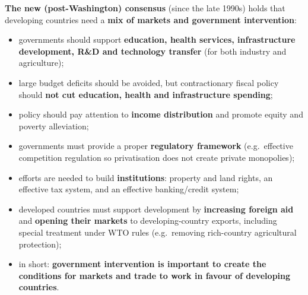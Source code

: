 \documentclass[a4paper,12pt]{article}
\begin{document}
\textbf{The new (post-Washington) consensus} (since the late 1990s) holds that developing countries need a \textbf{mix of markets and government intervention}:
\begin{itemize}
  \item governments should support \textbf{education, health services, infrastructure development, R\&D and technology transfer} (for both industry and agriculture);
  \item large budget deficits should be avoided, but contractionary fiscal policy should \textbf{not cut education, health and infrastructure spending};
  \item policy should pay attention to \textbf{income distribution} and promote equity and poverty alleviation;
  \item governments must provide a proper \textbf{regulatory framework} (e.g.\ effective competition regulation so privatisation does not create private monopolies);
  \item efforts are needed to build \textbf{institutions}: property and land rights, an effective tax system, and an effective banking/credit system;
  \item developed countries must support development by \textbf{increasing foreign aid} and \textbf{opening their markets} to developing-country exports, including special treatment under WTO rules (e.g.\ removing rich-country agricultural protection);
  \item in short: \textbf{government intervention is important to create the conditions for markets and trade to work in favour of developing countries}.
\end{itemize}
\end{document}

